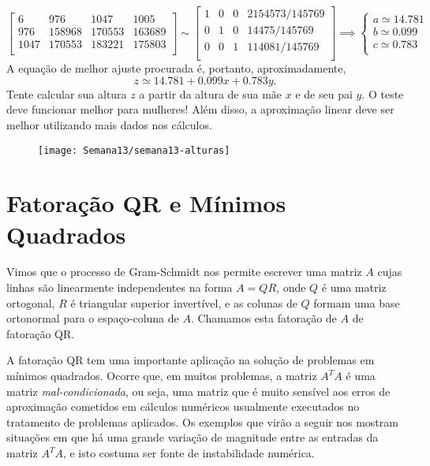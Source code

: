 \begin{ex}
\begin{equation}
\begin{bmatrix}
    6    & 976    & 1047   & 1005     \\
    976  & 158968 & 170553 & 163689   \\
    1047 & 170553 & 183221 & 175803   \\
  \end{bmatrix} \sim
  \begin{bmatrix}
    1 & 0 & 0  & 2154573/145769 \\
    0 & 1 & 0  & 14475/145769   \\
    0 & 0 & 1  & 114081/145769  \\
  \end{bmatrix} \implies
  \left\{
    \begin{array}{ll}
      a \simeq 14.781  \\
      b \simeq  0.099  \\
      c \simeq  0.783  \\
    \end{array}
  \right.
  \end{equation} A equação de melhor ajuste procurada é, portanto, aproximadamente,
  \begin{equation}
  z \simeq 14.781 + 0.099 x + 0.783 y.
  \end{equation} Tente calcular sua altura $z$ a partir da altura de sua mãe $x$ e de seu pai $y$. O teste deve funcionar melhor para mulheres! Além disso, a aproximação linear deve ser melhor utilizando mais dados nos cálculos.
  \begin{figure}[h!]
    \begin{center}
      \texttt{[image: Semana13/semana13-alturas]}
    \end{center}
  \end{figure}
\end{ex}

\section{Fatoração QR e Mínimos Quadrados}

Vimos que o processo de Gram-Schmidt nos permite escrever uma matriz $A$ cujas linhas são linearmente independentes na forma $A=QR$, onde $Q$ é uma matriz ortogonal, $R$ é triangular superior invertível, e as colunas de $Q$ formam uma base ortonormal para o espaço-coluna de $A$. Chamamos esta fatoração de $A$ de fatoração QR.

A fatoração QR tem uma importante aplicação na solução de problemas em mínimos quadrados. Ocorre que, em muitos problemas, a matriz $A^T A$ é uma matriz {\it mal-condicionada}, ou seja, uma matriz que é muito sensível aos erros de aproximação cometidos em cálculos numéricos usualmente executados no tratamento de problemas aplicados.
Os exemplos que virão a seguir nos mostram situações em que há uma grande variação de magnitude entre as entradas da matriz $A^T A$, e isto costuma ser fonte de instabilidade numérica.

